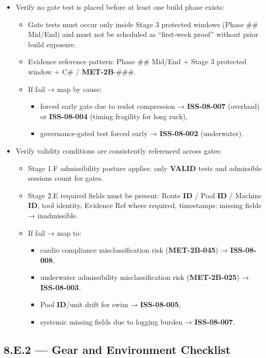 \documentclass[10pt]{article}
\begin{document}
\begin{itemize}
\item Verify no gate test is placed before at least one build phase exists:
  \begin{itemize}
  \item Gate tests must occur only inside Stage 3 protected windows (Phase \#\# Mid/End) and must not be scheduled as “first-week proof” without prior build exposure.
  \item Evidence reference pattern: Phase \#\# Mid/End + Stage 3 protected window + C\# / \textbf{MET-2B}-\#\#\#.
  \item If fail → map by cause:
    \begin{itemize}
    \item forced early gate due to reslot compression → \textbf{ISS-08-007} (overload) or \textbf{ISS-08-004} (timing fragility for long ruck),
    \item governance-gated test forced early → \textbf{ISS-08-002} (underwater).
    \end{itemize}
  \end{itemize}

\item Verify validity conditions are consistently referenced across gates:
  \begin{itemize}
  \item Stage 1.F admissibility posture applies: only \textbf{VALID} tests and admissible sessions count for gates.
  \item Stage 2.E required fields must be present: Route \textbf{ID} / Pool \textbf{ID} / Machine \textbf{ID}, tool identity, Evidence Ref where required, timestamps; missing fields → inadmissible.
  \item If fail → map to:
    \begin{itemize}
    \item cardio compliance misclassification risk (\textbf{MET-2B-045}) → \textbf{ISS-08-008},
    \item underwater admissibility misclassification risk (\textbf{MET-2B-025}) → \textbf{ISS-08-003},
    \item Pool \textbf{ID}/unit drift for swim → \textbf{ISS-08-005},
    \item systemic missing fields due to logging burden → \textbf{ISS-08-007}.
    \end{itemize}
  \end{itemize}
\end{itemize}

\subsection*{8.E.2 — Gear and Environment Checklist}
{}
\end{document}
